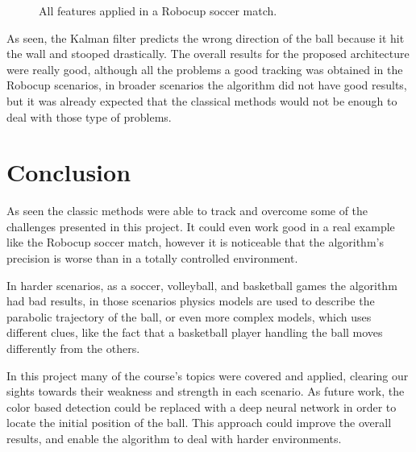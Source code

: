 \documentclass[10pt,twocolumn,letterpaper]{article}
\begin{document}
\begin{figure}[!h]
	\centering
	\setlength{\fboxsep}{1pt}
	\setlength{\fboxrule}{1pt}
	\caption{All features applied in a Robocup soccer match.}\label{fig:robocup2}
\end{figure}

As seen, the Kalman filter predicts the wrong direction of the ball because it hit the wall and stooped drastically. The overall results for the proposed architecture were really good, although all the problems a good tracking was obtained in the Robocup scenarios, in broader scenarios the algorithm did not have good results, but it was already expected that the classical methods would not be enough to deal with those type of problems.

\section{Conclusion}\label{sec:conclusion}

As seen the classic methods were able to track and overcome some of the
challenges presented in this project. It could even work good in a real example like the Robocup soccer match, however it is noticeable that the algorithm's precision is worse than in a totally controlled environment.

In harder scenarios, as a soccer, volleyball, and basketball games the algorithm had  bad results, in those scenarios physics models are used to describe the parabolic trajectory of the ball, or even  more complex models, which uses different clues, like the fact that a basketball player handling the ball moves differently from the others.

In this project  many of the course's topics were covered and applied, clearing our sights towards their weakness and strength in each scenario. As future work, the color based detection could be replaced with a deep neural network in order to locate the initial position of the ball. This approach could improve the overall results, and enable the algorithm to deal with harder environments.

{\small


}
\end{document}
